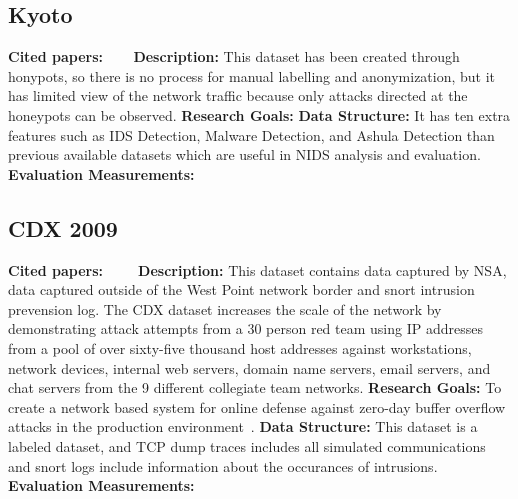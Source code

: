\subsection{Kyoto}
\textbf{Cited papers:} ~\cite{song2011statistical}~\cite{sato2012unknown}~\cite{chitrakar2012anomaly}\newline
\textbf{Description:} This dataset has been created through honypots, so there is no process for manual labelling and anonymization, but it has limited view of the network traffic because only attacks directed at the honeypots can be observed.\newline
\textbf{Research Goals:}  \newline
\textbf{Data Structure:} It has ten extra features such as IDS Detection, Malware Detection, and Ashula Detection than previous available datasets which are useful in NIDS analysis and evaluation. \newline
\textbf{Evaluation Measurements:} \newline




\subsection{CDX 2009}
\textbf{Cited papers:} ~\cite{homoliak2013asnm} ~\cite{sangster2009toward}~\cite{chen2014human}\newline
\textbf{Description:} This dataset contains data captured by NSA, data captured outside of the West Point network border and snort intrusion prevension log. The CDX
dataset increases the scale of the network by demonstrating attack attempts from a 30 person red team using IP addresses from a pool of over sixty-five thousand host addresses against workstations, network devices, internal web servers, domain name servers, email servers, and chat servers from the 9 different collegiate team networks.\newline
\textbf{Research Goals:} To create a network based system for online defense against zero-day buffer overflow attacks in the production environment~\cite{homoliak2013asnm}. \newline
\textbf{Data Structure:} This dataset is a labeled dataset, and TCP dump traces includes all simulated communications and snort logs include information about the occurances of intrusions. \newline
\textbf{Evaluation Measurements:} \newline






